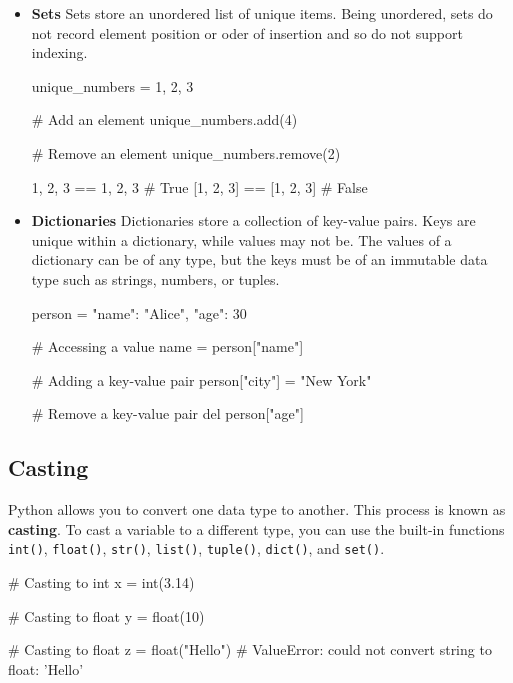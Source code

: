 \begin{itemize}
    \item \textbf{Sets}
    Sets store an unordered list of unique items. Being unordered, sets do not record element position or oder of insertion and so do not support indexing. 
    \begin{exampleblock}
    \begin{codeblock}[language=python]
unique_numbers = {1, 2, 3}

# Add an element
unique_numbers.add(4)

# Remove an element
unique_numbers.remove(2)

{1, 2, 3} == {1, 2, 3} # True
[1, 2, 3] == [1, 2, 3] # False
    \end{codeblock}
    \end{exampleblock}
    \item \textbf{Dictionaries}
    Dictionaries store a collection of key-value pairs. Keys are unique within a dictionary, while values may not be. The values of a dictionary can be of any type, but the keys must be of an immutable data type such as strings, numbers, or tuples.
    \begin{exampleblock}
    \begin{codeblock}[language=python]
person = {"name": "Alice", "age": 30}

# Accessing a value
name = person["name"]

# Adding a key-value pair
person["city"] = "New York"

# Remove a key-value pair
del person["age"]
    \end{codeblock}
    \end{exampleblock}
\end{itemize}

\subsection{Casting}

Python allows you to convert one data type to another. This process is known as \textbf{casting}. To cast a variable to a different type, you can use the built-in functions \texttt{int()}, \texttt{float()}, \texttt{str()}, \texttt{list()}, \texttt{tuple()}, \texttt{dict()}, and \texttt{set()}.
\begin{exampleblock}
\begin{codeblock}[language=python]
# Casting to int
x = int(3.14)

# Casting to float
y = float(10)

# Casting to float 
z = float("Hello") # ValueError: could not convert string to float: 'Hello'
\end{codeblock}
\end{exampleblock}




